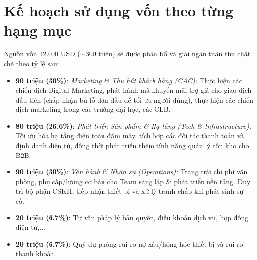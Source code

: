 \section{Kế hoạch sử dụng vốn theo từng hạng mục}
Nguồn vốn 12.000 USD ($\sim$300 triệu) sẽ được phân bổ và giải ngân tuân thủ chặt chẽ theo tỷ lệ sau:
\begin{itemize}
    \item \textbf{90 triệu (30\%)}: \textit{Marketing \& Thu hút khách hàng (CAC):} Thực hiện các chiến dịch Digital Marketing, phát hành mã khuyến mãi trợ giá cho giao dịch đầu tiên (chấp nhận bù lỗ đơn đầu để tối ưu người dùng), thực hiện các chiến dịch marketing trong các trường đại học, các CLB.
    \item \textbf{80 triệu (26.6\%)}: \textit{Phát triển Sản phẩm \& Hạ tầng (Tech \& Infrastructure):} Tối ưu hóa hạ tầng điện toán đám mây, tích hợp các đối tác thanh toán và định danh điện tử, đồng thời phát triển thêm tính năng quản lý tồn kho cho B2B.
    \item \textbf{90 triệu (30\%)}: \textit{Vận hành \& Nhân sự (Operations):} Trang trải chi phí văn phòng, phụ cấp/lương cơ bản cho Team sáng lập \& phát triển nền tảng. Duy trì bộ phận CSKH, tiếp nhận thiết bị và xử lý tranh chấp khi phát sinh sự cố.
    \item \textbf{20 triệu (6.7\%)}: Tư vấn pháp lý bản quyền, điều khoản dịch vụ, hợp đồng điện tử,...
    \item \textbf{20 triệu (6.7\%)}: Quỹ dự phòng rủi ro nợ xấu/hỏng hóc thiết bị và rủi ro thanh khoản.
\end{itemize}
